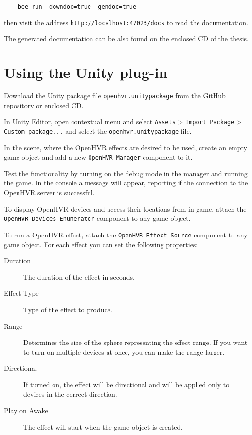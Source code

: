 \begin{verbatim}
    bee run -downdoc=true -gendoc=true
\end{verbatim}

then visit the address \verb|http://localhost:47023/docs| to read the
documentation.

The generated documentation can be also found on the enclosed CD of the thesis.

\section*{Using the Unity plug-in}

Download the Unity package file \verb|openhvr.unitypackage| from the GitHub
repository or enclosed CD.

In Unity Editor, open contextual menu and select 
\verb|Assets| > \verb|Import Package| > \verb|Custom package...| and select
the \verb|openhvr.unitypackage| file.

In the scene, where the OpenHVR effects are desired to be used, create an empty
game object and add a new \verb|OpenHVR Manager| component to it.

Test the functionality by turning on the debug mode in the manager and running
the game. In the console a message will appear, reporting if the connection
to the OpenHVR server is successful.

To display OpenHVR devices and access their locations from in-game, attach
the \verb|OpenHVR Devices Enumerator| component to any game object.

To run a OpenHVR effect, attach the \verb|OpenHVR Effect Source| component to
any game object. For each effect you can set the following properties:

\begin{description}
    \item[Duration] The duration of the effect in seconds.
    \item[Effect Type] Type of the effect to produce.
    \item[Range] Determines the size of the sphere representing the effect range.
    If you want to turn on multiple devices at once, you can make the range larger.
    \item[Directional] If turned on, the effect will be directional and will
    be applied only to devices in the correct direction.
    \item[Play on Awake] The effect will start when the game object is created.
\end{description}

